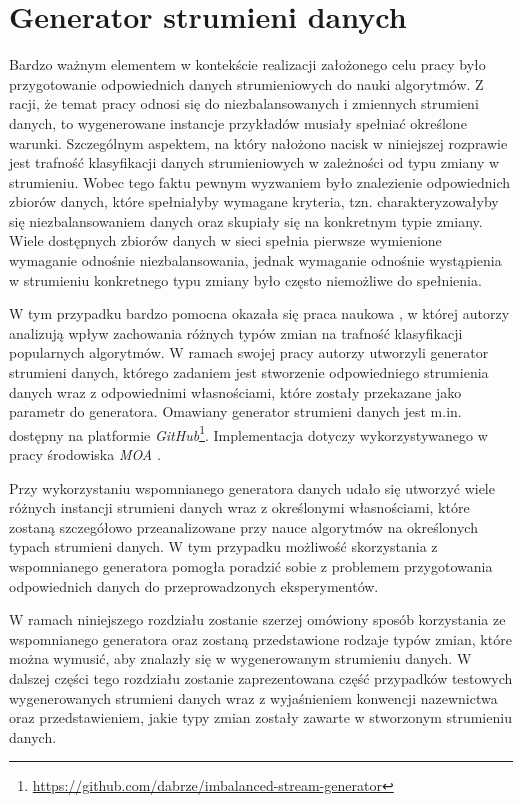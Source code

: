 \chapter{Generator strumieni danych}
\label{Chapter:Generator}

\noindent Bardzo ważnym elementem w kontekście realizacji założonego celu pracy było przygotowanie odpowiednich danych strumieniowych do nauki algorytmów. Z racji, że temat pracy odnosi się do niezbalansowanych i zmiennych strumieni danych, to wygenerowane instancje przykładów musiały spełniać określone warunki. Szczególnym aspektem, na który nałożono nacisk w niniejszej rozprawie jest trafność klasyfikacji danych strumieniowych w zależności od typu zmiany w strumieniu. Wobec tego faktu pewnym wyzwaniem było znalezienie odpowiednich zbiorów danych, które spełniałyby wymagane kryteria, tzn. charakteryzowałyby się niezbalansowaniem danych oraz skupiały się na konkretnym typie zmiany. Wiele dostępnych zbiorów danych w sieci spełnia pierwsze wymienione wymaganie odnośnie niezbalansowania, jednak wymaganie odnośnie wystąpienia w strumieniu konkretnego typu zmiany było często niemożliwe do spełnienia.

W tym przypadku bardzo pomocna okazała się praca naukowa \cite{Article:TypyPrzykladow}, w której autorzy analizują wpływ zachowania różnych typów zmian na trafność klasyfikacji popularnych algorytmów. W ramach swojej pracy autorzy utworzyli generator strumieni danych, którego zadaniem jest stworzenie odpowiedniego strumienia danych wraz z odpowiednimi własnościami, które zostały przekazane jako parametr do generatora. Omawiany generator strumieni danych jest m.in. dostępny na platformie \textit{GitHub}\footnote{\url{https://github.com/dabrze/imbalanced-stream-generator}}. Implementacja dotyczy wykorzystywanego w pracy środowiska \textit{MOA} \cite{Article:MOA}.

Przy wykorzystaniu wspomnianego generatora danych udało się utworzyć wiele różnych instancji strumieni danych wraz z określonymi własnościami, które zostaną szczegółowo przeanalizowane przy nauce algorytmów na określonych typach strumieni danych. W tym przypadku możliwość skorzystania z wspomnianego generatora pomogła poradzić sobie z problemem przygotowania odpowiednich danych do przeprowadzonych eksperymentów.

W ramach niniejszego rozdziału zostanie szerzej omówiony sposób korzystania ze wspomnianego generatora oraz zostaną przedstawione rodzaje typów zmian, które można wymusić, aby znalazły się w wygenerowanym strumieniu danych. W dalszej części tego rozdziału zostanie zaprezentowana część przypadków testowych wygenerowanych strumieni danych wraz z wyjaśnieniem konwencji nazewnictwa oraz przedstawieniem, jakie typy zmian zostały zawarte w stworzonym strumieniu danych.

